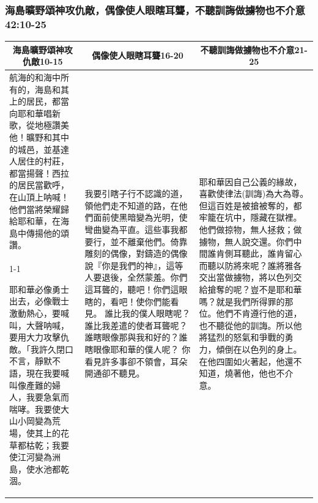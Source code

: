 \subsubsection{海島曠野頌神攻仇敵，偶像使人眼瞎耳聾，不聽訓誨做擄物也不介意 42:10-25}
\begin{table}[H]
\centering
\begin{tabular}{p{}|p{}|p{5.750cm}}\hline\hline
\multicolumn{1}{c|}{海島曠野頌神攻仇敵10-15}&\multicolumn{1}{c|}{偶像使人眼瞎耳聾16-20}&\multicolumn{1}{c}{不聽訓誨做擄物也不介意21-25}\\\hline
航海的和海中所有的，海島和其上的居民，都當向耶和華唱新歌，從地極讚美他！曠野和其中的城邑，並基達人居住的村莊，都當揚聲！西拉的居民當歡呼，在山頂上呐喊！他們當將榮耀歸給耶和華，在海島中傳揚他的頌讚。 
&\multirow{2}{5.1cm}{我要引瞎子行不認識的道，領他們走不知道的路，在他們面前使黑暗變為光明，使彎曲變為平直。這些事我都要行，並不離棄他們。倚靠雕刻的偶像，對鑄造的偶像說『你是我們的神』，這等人要退後，全然蒙羞。你們這耳聾的，聽吧！你們這眼瞎的，看吧！使你們能看見。
誰比我的僕人眼瞎呢？誰比我差遣的使者耳聾呢？誰瞎眼像那與我和好的？誰瞎眼像耶和華的僕人呢？
你看見許多事卻不領會，耳朵開通卻不聽見。}
&\multirow{2}{5.6cm}{耶和華因自己公義的緣故，喜歡使律法(訓誨)為大為尊。但這百姓是被搶被奪的，都牢籠在坑中，隱藏在獄裡。他們做掠物，無人拯救；做擄物，無人說交還。你們中間誰肯側耳聽此，誰肯留心而聽以防將來呢？誰將雅各交出當做擄物，將以色列交給搶奪的呢？豈不是耶和華嗎？就是我們所得罪的那位。他們不肯遵行他的道，也不聽從他的訓誨。所以他將猛烈的怒氣和爭戰的勇力，傾倒在以色列的身上。在他四圍如火著起，他還不知道，燒著他，他也不介意。}\\\cline{1-1}

耶和華必像勇士出去，必像戰士激動熱心，要喊叫，大聲呐喊，要用大力攻擊仇敵。「我許久閉口不言，靜默不語，現在我要喊叫像產難的婦人，我要急氣而喘哮。我要使大山小岡變為荒場，使其上的花草都枯乾；我要使江河變為洲島，使水池都乾涸。&&\\\hline
\end{tabular}
\end{table}






